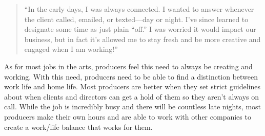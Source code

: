 \begin{multicols}{2}
	\begin{quote}
		“In the early days, I was always connected. I wanted to answer whenever the client called, emailed, or texted—day or night. I’ve since learned to designate some time as just plain “off.” I was worried it would impact our business, but in fact it’s allowed me to stay fresh and be more creative and engaged when I am working!” 
	\end{quote}
	
	As for most jobs in the arts, producers feel this need to always be creating and working. With this need, producers need to be able to find a distinction between work life and home life. Most producers are better when they set strict guidelines about when clients and directors can get a hold of them so they aren’t always on call. While the job is incredibly busy and there will be countless late nights, most producers make their own hours and are able to work with other companies to create a work/life balance that works for them.
\end{multicols}